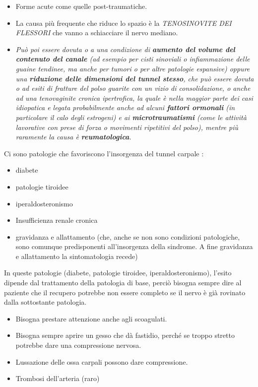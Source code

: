\documentclass[]{article}
\begin{document}
\begin{itemize}
\item
  Forme acute come quelle post-traumatiche.
\item
  La causa più frequente che riduce lo spazio è la \emph{TENOSINOVITE
  DEI FLESSORI} che vanno a schiacciare il nervo mediano.
\item
  \emph{Può poi essere dovuta o a una condizione di
  \textbf{\emph{aumento del volume del contenuto del canale}} (ad
  esempio per \emph{cisti sinoviali} o \emph{infiammazione delle guaine
  tendinee}, ma anche per \emph{tumori} o per altre \emph{patologie
  espansive}) oppure una \textbf{\emph{riduzione delle dimensioni del
  tunnel stesso}}, che può essere dovuta o ad \emph{esiti di fratture
  del polso} guarite con un vizio di consolidazione, o anche ad una
  \emph{tenovaginite cronica ipertrofica}, la quale è nella maggior
  parte dei casi idiopatica e legata probabilmente anche ad alcuni
  \textbf{fattori ormonali} (in particolare il calo degli estrogeni) e
  ai \textbf{microtraumatismi} (come le attività lavorative con prese di
  forza o movimenti ripetitivi del polso), mentre più raramente la causa
  è \textbf{\emph{reumatologica}}.}
\end{itemize}

Ci sono patologie che favoriscono l'insorgenza del tunnel carpale :

\begin{itemize}
\item
  diabete
\item
  patologie tiroidee
\item
  iperaldosteronismo
\item
  Insufficienza renale cronica
\item
  gravidanza e allattamento (che, anche se non sono condizioni
  patologiche, sono comunque predisponenti all'insorgenza della
  sindrome. A fine gravidanza e allattamento la sintomatologia recede)
\end{itemize}

In queste patologie (diabete, patologie tiroidee, iperaldosteronismo),
l'esito dipende dal trattamento della patologia di base, perciò bisogna
sempre dire al paziente che il recupero potrebbe non essere completo se
il nervo è già rovinato dalla sottostante patologia.

\begin{itemize}
\item
  Bisogna prestare attenzione anche agli scoagulati.
\item
  Bisogna sempre aprire un gesso che dà fastidio, perché se troppo
  stretto potrebbe dare una compressione nervosa.
\item
  Lussazione delle ossa carpali possono dare compressione.
\item
  Trombosi dell'arteria (raro)
\end{itemize}
\end{document}
